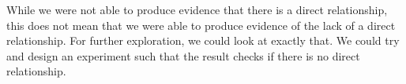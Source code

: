 \documentclass[fontsize=11pt]{article}
\begin{document}
While we were not able to produce evidence that there is a direct relationship, this does not mean that we were able to produce evidence of the lack of a direct relationship.
For further exploration, we could look at exactly that.
We could try and design an experiment such that the result checks if there is no direct relationship.

\raggedright %
\printbibliography

\end{document}
